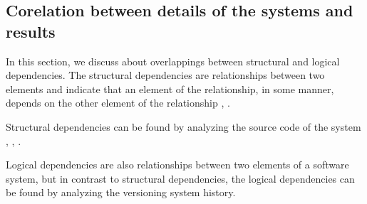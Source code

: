 \documentclass[12pt]{mitthesis}
\begin{document}
\begin{table}[!h]
\renewcommand{\arraystretch}{1}
\caption{Measurements for Hibernate using only logical dependencies}
\label{tab:measurementshistory:hibernate}
\centering
{}
\end{table}

\subsection{Corelation between details of the systems and results}
\label{sec:overlapping}

In this section, we discuss about overlappings between structural and logical dependencies. 
The structural dependencies are relationships between two elements and indicate that an element of the relationship, in some manner, depends on the other element of the relationship \cite{Booch:2004:OAD:975416}, \cite{Cataldo2009SoftwareDW}.

Structural dependencies can be found by analyzing the source code of the system \cite{Sangal:2005:UDM:1094811.1094824}, \cite{CalloArias2011}, \cite{structdep}. 

Logical dependencies are also relationships between two elements of a  software system, but in contrast to structural dependencies, the logical dependencies can be found by analyzing the versioning system history.
\end{document}
